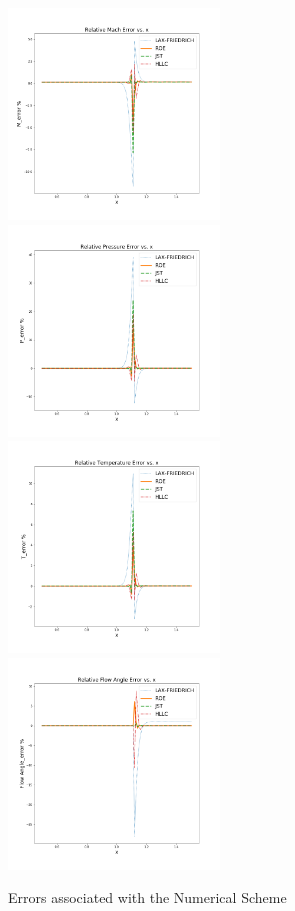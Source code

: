 \begin{figure}[H]
    \includegraphics[width=0.5\textwidth]{text/M_error_comparison.png}
    \includegraphics[width=0.5\textwidth]{text/P_error_comparison.png}
    \includegraphics[width=0.5\textwidth]{text/T_error_comparison.png}
    \includegraphics[width=0.5\textwidth]{text/FA_error_comparison.png}
    \caption[Errors associated with the Numerical Scheme]{Errors associated with the Numerical Scheme}
    \label{fig:Errors associated with the Numerical Scheme}
\end{figure}
